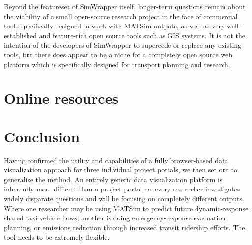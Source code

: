 \documentclass[3p,times,procedia]{elsarticle}
\begin{document}
Beyond the featureset of SimWrapper itself, longer-term questions remain about the viability of a small open-source research project in the face of commercial tools specifically designed to work with MATSim outputs, as well as very well-established and feature-rich open source tools such as GIS systems. It is not the intention of the developers of SimWrapper to supercede or replace any existing tools, but there does appear to be a niche for a completely open source web platform which is specifically designed for transport planning and research.

\section{Online resources}

\section{Conclusion}

Having confirmed the utility and capabilities of a fully browser-based data visualization approach for three individual project portals, we then set out to generalize the method. An entirely generic data visualization platform is inherently more difficult than a project portal, as every researcher investigates widely disparate questions and will be focusing on completely different outputs. Where one researcher may be using MATSim to predict future dynamic-response shared taxi vehicle flows, another is doing emergency-response evacuation planning, or emissions reduction through increased transit ridership efforts. The tool needs to be extremely flexible.



\end{document}
